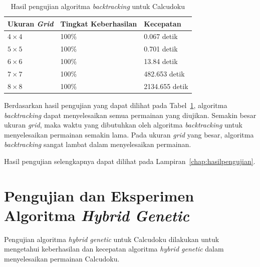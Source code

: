 \begin{table}
\centering
\captionsetup{justification=centering}
\caption[Hasil pengujian algoritma \textit{backtracking} untuk Calcudoku]{Hasil pengujian algoritma \textit{backtracking} untuk Calcudoku}
\begin{tabular}{| l | l | l |}
\hline
Ukuran \textit{Grid} & Tingkat Keberhasilan & Kecepatan \\
\hline \hline
\begin{math}4 \times 4\end{math} & 100\% & 0.067 detik \\
\hline
\begin{math}5 \times 5\end{math} & 100\% & 0.701 detik \\
\hline
\begin{math}6 \times 6\end{math} & 100\% & 13.84 detik \\
\hline
\begin{math}7 \times 7\end{math} & 100\% & 482.653 detik \\
\hline
\begin{math}8 \times 8\end{math} & 100\% & 2134.655 detik \\
\hline
\end{tabular}
\label{tab:pengujianbt}
\end{table}

Berdasarkan hasil pengujian yang dapat dilihat pada Tabel~\ref{tab:pengujianbt}, algoritma \textit{backtracking} dapat menyelesaikan semua permainan yang diujikan. Semakin besar ukuran \textit{grid}, maka waktu yang dibutuhkan oleh algoritma \textit{backtracking} untuk menyelesaikan permainan semakin lama. Pada ukuran \textit{grid} yang besar, algoritma \textit{backtracking} sangat lambat dalam menyelesaikan permainan.

Hasil pengujian selengkapnya dapat dilihat pada Lampiran~\ref{chap:hasilpengujian}.

\section{Pengujian dan Eksperimen Algoritma \textit{Hybrid Genetic}}
\label{sec:pengujianhybridgenetic}

Pengujian algoritma \textit{hybrid genetic} untuk Calcudoku dilakukan untuk mengetahui keberhasilan dan kecepatan algoritma \textit{hybrid genetic} dalam menyelesaikan permainan Calcudoku.

